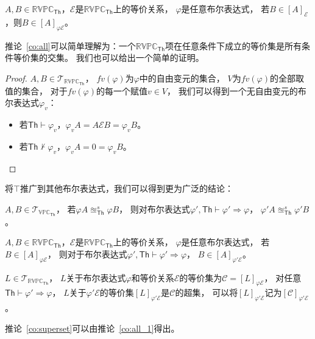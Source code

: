    \begin{corollary}\label{co:all}
      $A,B\in \mathbb{RVPC}_{\mathsf{Th}}$，$\mathcal{E}$是$\mathbb{RVPC}_{\mathsf{Th}}$上的等价关系，
      $\varphi$是任意布尔表达式，
      若$B\in [A]_{\mathcal{E}}$，则$B\in [A]_{\varphi \mathcal{E}}$。
   \end{corollary}
   
   推论~\ref{co:all}可以简单理解为：一个$\mathbb{RVPC}_{\mathsf{Th}}$项在任意条件下成立的等价集是所有条件等价集的交集。
   我们也可以给出一个简单的证明。
   \begin{proof}
      $A,B\in \mathcal{T}_{\mathbb{RVPC}_{\mathsf{Th}}}$，
      $fv(\varphi)$为$\varphi$中的自由变元的集合，
      $V$为$fv(\varphi)$的全部取值的集合，
      对于$fv(\varphi)$的每一个赋值$v\in V$，
      我们可以得到一个无自由变元的布尔表达式$\varphi_v$：
      \begin{itemize}
         \item {
            若$\mathsf{Th}\vdash \varphi_v$，$\varphi_vA=A\mathcal{E}B=\varphi_v B$。
         }
         \item {
            若$\mathsf{Th}\not\vdash \varphi_v$，$\varphi_v A=0=\varphi_v B$。
         }
      \end{itemize}
   \end{proof}

   将$\top$推广到其他布尔表达式，我们可以得到更为广泛的结论：

   \begin{corollary}\label{co:condition}
      $A,B\in \mathcal{T}_{\mathbb{VPC}_{\mathsf{Th}}}$，
      若$\varphi A\approxeq_{\mathsf{Th}}^s \varphi B$，
      则对布尔表达式$\varphi',\mathsf{Th}\vdash \varphi'\Rightarrow \varphi$，
      $\varphi' A\approxeq_{\mathsf{Th}}^s\varphi' B$。
   \end{corollary}

   \begin{corollary}\label{co:all_1}
      $A,B\in \mathbb{RVPC}_{\mathsf{Th}}$，$\mathcal{E}$是$\mathbb{RVPC}_{\mathsf{Th}}$上的等价关系，
      $\varphi$是任意布尔表达式，
      若$B\in [A]_{\varphi\mathcal{E}}$，
      则对于布尔表达式$\varphi',\mathsf{Th}\vdash\varphi'\Rightarrow \varphi$，
      $B\in [A]_{\varphi' \mathcal{E}}$。
   \end{corollary}

   \begin{corollary}\label{co:superset}
      $L\in \mathcal{T}_{\mathbb{RVPC}_{\mathsf{Th}}}$，
      $L$关于布尔表达式$\varphi$和等价关系$\mathcal{E}$的等价集为$\mathcal{C}=[L]_{\varphi\mathcal{E}}$，
      对任意$\mathsf{Th}\vdash \varphi'\Rightarrow\varphi$，
      $L$关于$\varphi'\mathcal{E}$的等价集$[L]_{\varphi'\mathcal{E}}$是$\mathcal{C}$的超集，
      可以将$[L]_{\varphi'\mathcal{E}}$记为$[\mathcal{C}]_{\varphi'\mathcal{E}}$。
   \end{corollary}
   推论~\ref{co:superset}可以由推论~\ref{co:all_1}得出。

